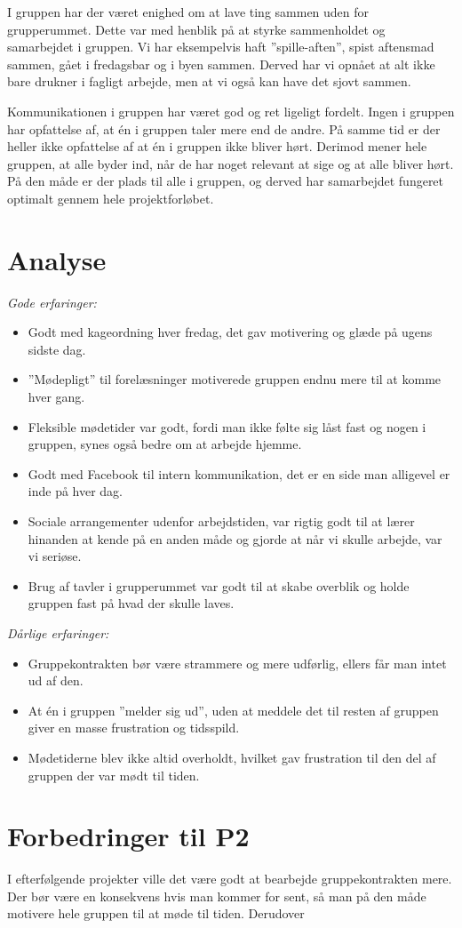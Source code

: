 I gruppen har der været enighed om at lave ting sammen uden for grupperummet. Dette var med henblik på at styrke sammenholdet og samarbejdet i gruppen. Vi har eksempelvis haft ”spille-aften”, spist aftensmad sammen, gået i fredagsbar og i byen sammen. Derved har vi opnået at alt ikke bare drukner i fagligt arbejde, men at vi også kan have det sjovt sammen.

Kommunikationen i gruppen har været god og ret ligeligt fordelt. Ingen i gruppen har opfattelse af, at én i gruppen taler mere end de andre. På samme tid er der heller ikke opfattelse af at én i gruppen ikke bliver hørt. Derimod mener hele gruppen, at alle byder ind, når de har noget relevant at sige og at alle bliver hørt. På den måde er der plads til alle i gruppen, og derved har samarbejdet fungeret optimalt gennem hele projektforløbet.

\section{Analyse}

\emph{Gode erfaringer:}
\begin{itemize}
\item	Godt med kageordning hver fredag, det gav motivering og glæde på ugens sidste dag. 

\item	”Mødepligt” til forelæsninger motiverede gruppen endnu mere til at komme hver gang. 

\item	Fleksible mødetider var godt, fordi man ikke følte sig låst fast og nogen i gruppen, synes også bedre om at arbejde hjemme.  

\item	Godt med Facebook til intern kommunikation, det er en side man alligevel er inde på hver dag.

\item	Sociale arrangementer udenfor arbejdstiden, var rigtig godt til at lærer hinanden at kende på en anden måde og gjorde at når vi skulle arbejde, var vi seriøse. 

\item	 Brug af tavler i grupperummet var godt til at skabe overblik og holde gruppen fast på hvad der skulle laves. 
\end{itemize}\emph{Dårlige erfaringer:}
\begin{itemize}
\item	Gruppekontrakten bør være strammere og mere udførlig, ellers får man intet ud af den.

\item	 At én i gruppen ”melder sig ud”, uden at meddele det til resten af gruppen giver en masse frustration og tidsspild.

\item	Mødetiderne blev ikke altid overholdt, hvilket gav frustration til den del af gruppen der var mødt til tiden.
\end{itemize}

\section{Forbedringer til P2}

I efterfølgende projekter ville det være godt at bearbejde gruppekontrakten mere. Der bør være en konsekvens hvis man kommer for sent, så man på den måde motivere hele gruppen til at møde til tiden. Derudover 
